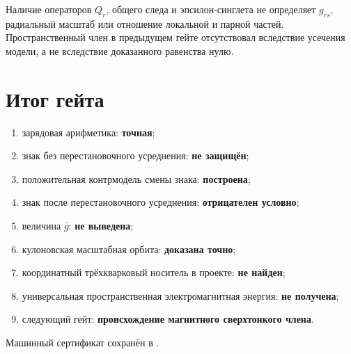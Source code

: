 \begin{nogocriterion}
Наличие операторов $Q_r$, общего следа и эпсилон-синглета не определяет
$g_{rs}$, радиальный масштаб или отношение локальной и парной частей.
Пространственный член в предыдущем гейте отсутствовал вследствие
усечения модели, а не вследствие доказанного равенства нулю.
\end{nogocriterion}

\section{Итог гейта}

\begin{protocol}
\begin{enumerate}
 \item зарядовая арифметика: \textbf{точная};
 \item знак без перестановочного усреднения: \textbf{не защищён};
 \item положительная контрмодель смены знака: \textbf{построена};
 \item знак после перестановочного усреднения: \textbf{отрицателен условно};
 \item величина $\bar g$: \textbf{не выведена};
 \item кулоновская масштабная орбита: \textbf{доказана точно};
 \item координатный трёхкварковый носитель в проекте: \textbf{не найден};
 \item универсальная пространственная электромагнитная энергия:
       \textbf{не получена};
 \item следующий гейт: \textbf{происхождение магнитного сверхтонкого члена}.
\end{enumerate}
\end{protocol}

Машинный сертификат сохранён в
.